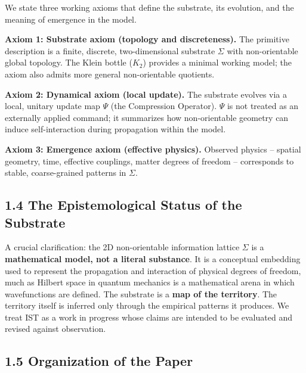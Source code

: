 \documentclass[
  11pt,
]{article}
\begin{document}
We state three working axioms that define the substrate, its evolution,
and the meaning of emergence in the model.

\textbf{Axiom 1: Substrate axiom (topology and discreteness).} The
primitive description is a finite, discrete, two-dimensional substrate
\(\Sigma\) with non-orientable global topology. The Klein bottle
(\(K_2\)) provides a minimal working model; the axiom also admits more
general non-orientable quotients.

\textbf{Axiom 2: Dynamical axiom (local update).} The substrate evolves
via a local, unitary update map \(\Psi\) (the Compression Operator).
\(\Psi\) is not treated as an externally applied command; it summarizes
how non-orientable geometry can induce self-interaction during
propagation within the model.

\textbf{Axiom 3: Emergence axiom (effective physics).} Observed physics
-- spatial geometry, time, effective couplings, matter degrees of
freedom -- corresponds to stable, coarse-grained patterns in \(\Sigma\).

\subsection{1.4 The Epistemological Status of the
Substrate}\label{the-epistemological-status-of-the-substrate}

A crucial clarification: the 2D non-orientable information lattice
\(\Sigma\) is a \textbf{mathematical model, not a literal substance}. It
is a conceptual embedding used to represent the propagation and
interaction of physical degrees of freedom, much as Hilbert space in
quantum mechanics is a mathematical arena in which wavefunctions are
defined. The substrate is a \textbf{map of the territory}. The territory
itself is inferred only through the empirical patterns it produces. We
treat IST as a work in progress whose claims are intended to be
evaluated and revised against observation.

\subsection{1.5 Organization of the
Paper}\label{organization-of-the-paper}
\end{document}

